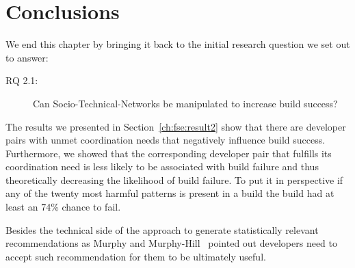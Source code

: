 \section{Conclusions}
\label{sec:8:conclusions}
We end this chapter by bringing it back to the initial research question we set out to answer:
\begin{description}
  \item[RQ 2.1:] Can Socio-Technical-Networks be manipulated to increase build success? 
\end{description}

The results we presented in Section~\ref{ch:fse:result2} show that there are developer pairs with unmet coordination needs that negatively influence build success.
Furthermore, we showed that the corresponding developer pair that fulfills its coordination need is less likely to be associated with build failure and thus theoretically decreasing the likelihood of build failure.
To put it in perspective if any of the twenty most harmful patterns is present in a build the build had at least an 74\% chance to fail.

Besides the technical side of the approach to generate statistically relevant recommendations as Murphy and Murphy-Hill~\cite{murphy:rsse:2010} pointed out developers need to accept such recommendation for them to be ultimately useful.